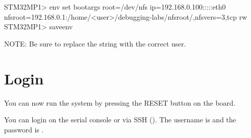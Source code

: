 \begin{bashinput}
STM32MP1> env set bootargs root=/dev/nfs ip=192.168.0.100:::::eth0
  nfsroot=192.168.0.1:/home/<user>/debugging-labs/nfsroot/,nfsvers=3,tcp rw
STM32MP1> saveenv
\end{bashinput}

NOTE: Be sure to replace the  string with the correct user.

\section{Login}

You can now run the system by pressing the RESET button on the board.

You can login on the serial console or via SSH (). The username is  and the password
is .

